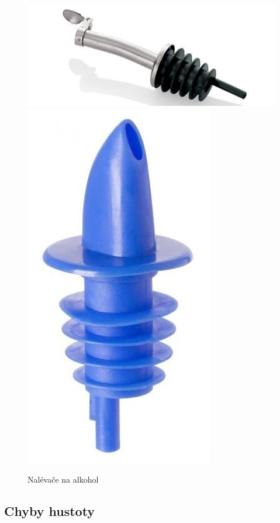 \begin{figure}[H]
    \begin{center}
        \includegraphics[scale=0.6]{obrazky/nalevac.jpg}
        \includegraphics[scale=0.15]{obrazky/nelévač_plast.jpg}
    \end{center}
    \label{nalevačos}
    \caption{Nalévače na alkohol \cite{nalevatko}}
\end{figure}

\subsection{Chyby hustoty}

